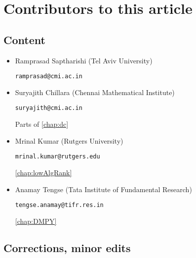 \chapter*{Contributors to this article}

\section*{Content}

\begin{itemize}
\item Ramprasad Saptharishi (Tel Aviv University)

\texttt{ramprasad@cmi.ac.in}

\item Suryajith Chillara (Chennai Mathematical Institute)

\texttt{suryajith@cmi.ac.in}

Parts of \autoref{chap:dc}

  
\item Mrinal Kumar (Rutgers University)

\texttt{mrinal.kumar@rutgers.edu}

\autoref{chap:lowAlgRank}

\item Anamay Tengse (Tata Institute of Fundamental Research)

\texttt{tengse.anamay@tifr.res.in}

\autoref{chap:DMPY}

\end{itemize}

\section*{Corrections, minor edits}


